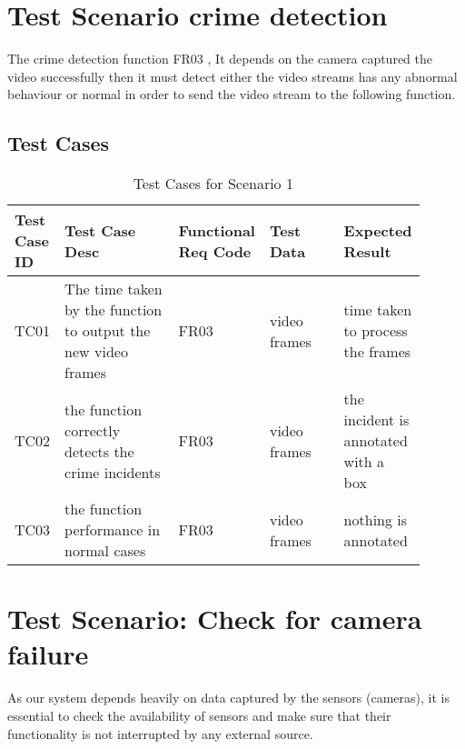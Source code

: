 \documentclass[12pt]{article}
\begin{document}
\section{Test Scenario crime detection}\label{sec:TSx}

The crime detection function FR03 , It depends on the camera captured the video successfully then it must detect either the video streams has any abnormal behaviour or normal in order to send the video stream to the following function.  
\subsection{Test Cases}
\begin{table}[h]
\caption{Test Cases for Scenario 1}
\label{tab:TC1}
\begin{tabular}{|p{0.1\linewidth}|p{0.3\linewidth}|p{0.1\linewidth}|p{0.2\linewidth}|p{0.2\linewidth}|}
\hline
Test Case ID & Test Case Desc & Functional Req Code & Test Data & Expected Result \\ \hline
TC01  & The time taken by the function to output the new video frames & FR03 &  video frames  &   time taken to process the frames               \\ \hline
TC02 & the function correctly detects the crime incidents   & FR03    &  video frames     &  the incident is annotated with a box          \\ \hline
TC03 & the function performance in normal cases  & FR03    &  video frames     &  nothing is annotated          \\ \hline

\end{tabular}
\end{table}
\newpage
\section{Test Scenario: Check for camera failure}\label{sec:TSy}
As our system depends heavily on data captured by the sensors (cameras), it is essential to check the availability of sensors and make sure that their functionality is not interrupted by any external source.
\end{document}
